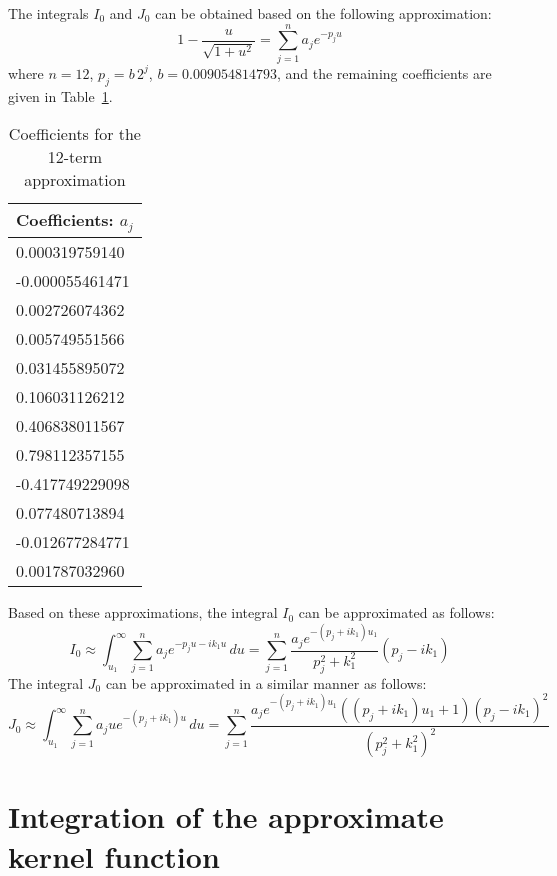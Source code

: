 \documentclass[12pt]{article}
\newcommand{\f}{\frac}
\begin{document}
The integrals $I_{0}$ and $J_{0}$ can be obtained based on the
following approximation:
%
\begin{equation*}
  1 - \f{u}{\sqrt{1 + u^{2}}} = \sum_{j=1}^{n} a_{j} e^{-p_{j}u}
\end{equation*}
%
where $n = 12$, $p_{j} = b\,2^{j}$, $b = 0.009054814793$, and the
remaining coefficients are given in Table~\ref{table:a-coef}.
%
\begin{table}[h]
  \begin{center}
    \begin{tabular}{l}
      \toprule
      Coefficients: $a_{j}$ \\
      \midrule
      0.000319759140 \\
      -0.000055461471 \\
      0.002726074362 \\
      0.005749551566 \\
      0.031455895072 \\
      0.106031126212 \\
      0.406838011567 \\
      0.798112357155 \\
      -0.417749229098 \\
      0.077480713894 \\
      -0.012677284771 \\
      0.001787032960 \\
      \bottomrule
    \end{tabular}
  \end{center}
  \caption{Coefficients for the 12-term approximation}
  \label{table:a-coef}
\end{table}

Based on these approximations, the integral $I_{0}$ can be
approximated as follows:
%
\begin{equation*}
  I_{0} \approx \int_{u_{1}}^{\infty} \sum_{j=1}^{n} a_{j} e^{-p_{j}u - ik_{1}u} \, du 
  = \sum_{j=1}^{n} \f{a_{j}e^{-(p_{j} + i k_{1})u_{1}}}{p_{j}^2 + k_{1}^2} (p_{j} - i k_1)
\end{equation*}
%
The integral $J_{0}$ can be approximated in a similar manner as
follows:
%
\begin{equation*}
  J_{0} \approx \int_{u_{1}}^{\infty} \sum_{j=1}^{n} a_{j} u e^{-(p_{j} + ik_{1})u} \, du 
  = \sum_{j=1}^{n} \f{a_{j}e^{-(p_{j} + i k_{1})u_{1}}((p_{j} + i k_1)u_{1} + 1)(p_{j} - ik_{1})^2}{(p_{j}^2 + k_{1}^2)^2}
\end{equation*}

\section{Integration of the approximate kernel function}
\end{document}
